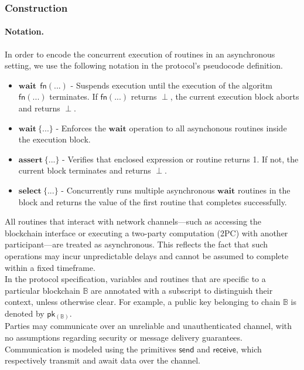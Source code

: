 \subsubsection{Construction}
\paragraph*{Notation.} In order to encode the concurrent execution of routines in an asynchronous setting, we use the following notation in the protocol's pseudocode definition.
\begin{itemize}[nosep, noitemsep]
    \item $\mathbf{wait} \:\: \mathsf{fn}(...)$ - Suspends execution until the execution of the algoritm $\mathsf{fn}(...)$ terminates. If $\mathsf{fn}(...)$ returns $\perp$, the current execution block aborts and returns $\perp$.
    \item $\mathbf{wait} \: \{...\}$ - Enforces the $\mathbf{wait}$ operation to all asynchonous routines inside the execution block.
    \item $\mathbf{assert} \: \{...\}$ - Verifies that enclosed expression or routine returns 1. If not, the current block terminates and returns $\perp$.
    \item $\mathbf{select} \: \{...\}$ - Concurrently runs multiple asynchronous $\mathbf{wait}$ routines in the block and returns the value of the first routine that completes successfully.
\end{itemize}
All routines that interact with network channels—such as accessing the blockchain interface or executing a two-party computation (2PC) with another participant—are treated as asynchronous. This reflects the fact that such operations may incur unpredictable delays and cannot be assumed to complete within a fixed timeframe. \\
In the protocol specification, variables and routines that are specific to a particular blockchain $\mathbb{B}$ are annotated with a subscript to distinguish their context, unless otherwise clear. For example, a public key belonging to chain $\mathbb{B}$ is denoted by $\mathsf{pk_{(\mathbb{B})}}$. \\
Parties may communicate over an unreliable and unauthenticated channel, with no assumptions regarding security or message delivery guarantees. Communication is modeled using the primitives $\mathsf{send}$ and $\mathsf{receive}$, which respectively transmit and await data over the channel.

